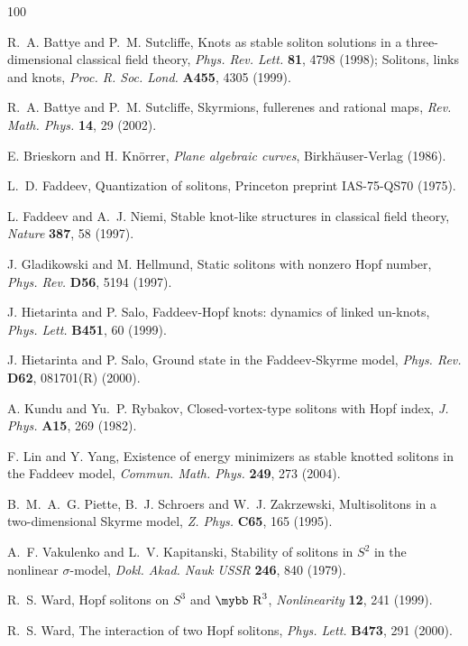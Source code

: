 \documentclass[12pt]{article}
\def\bb#1{\hbox{\mybb#1}}
\begin{document}
\begin{thebibliography}{100}

 R.~A. Battye and P.~M. Sutcliffe,
Knots as stable soliton solutions in a
three-dimensional classical field theory,
\textit{Phys. Rev. Lett.} \textbf{81}, 4798 (1998);
Solitons, links and knots, \textit{Proc. R. Soc. Lond.} \textbf{A455},
4305 (1999).

 R.~A. Battye and P.~M. Sutcliffe,
Skyrmions, fullerenes and rational maps,
\textit{Rev. Math. Phys.} \textbf{14}, 29 (2002).

 E. Brieskorn and H. Kn\"orrer,
{\em Plane algebraic curves}, Birkh\"auser-Verlag (1986).

 L.~D. Faddeev,
Quantization of solitons,
Princeton preprint IAS-75-QS70 (1975).

 L. Faddeev and A.~J. Niemi,
Stable knot-like structures in classical field theory,
\textit{Nature} \textbf{387}, 58 (1997).

 J. Gladikowski and M. Hellmund,
Static solitons with nonzero Hopf number,
\textit{Phys. Rev.} \textbf{D56}, 5194 (1997).

 J. Hietarinta and P. Salo,
Faddeev-Hopf knots: dynamics of linked un-knots,
\textit{Phys. Lett.} \textbf{B451}, 60 (1999).

 J. Hietarinta and P. Salo,
Ground state in the Faddeev-Skyrme model,
\textit{Phys. Rev.} \textbf{D62}, 081701(R) (2000).

 A. Kundu and Yu.~P. Rybakov,
Closed-vortex-type solitons with Hopf index,
\textit{J. Phys.} \textbf{A15}, 269 (1982).

 F. Lin and Y. Yang,
Existence of energy minimizers as stable knotted solitons in the
Faddeev model,
\textit{Commun. Math. Phys.} \textbf{249}, 273 (2004).

B.~M.~A.~G. Piette, B.~J. Schroers and W.~J. Zakrzewski,
Multisolitons in a two-dimensional Skyrme model,
\textit{Z. Phys.} \textbf{C65}, 165 (1995).

A.~F. Vakulenko and L.~V. Kapitanski,
Stability of solitons in $S^2$ in the nonlinear $\sigma$-model,
\textit{Dokl. Akad. Nauk USSR} \textbf{246}, 840 (1979).

 R.~S. Ward,
Hopf solitons on $S^3$ and $\bb{R}^3$,
\textit{Nonlinearity} \textbf{12}, 241 (1999).

 R.~S. Ward,
The interaction of two Hopf solitons,
\textit{Phys. Lett.} \textbf{B473}, 291 (2000).




\end{thebibliography}
\end{document}
